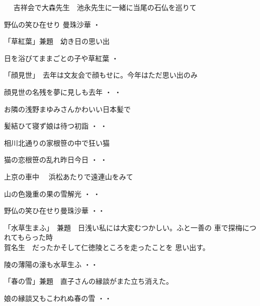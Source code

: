 　
吉祥会で大森先生　池永先生に一緒に当尾の石仏を巡りて　

\begin{shiika}
野仏の笑ひ在せり 曼珠沙華\hfill {  ・  }
\end{shiika}
\vspace{0.6cm}
「草紅葉」兼題　幼き日の思い出　
\begin{shiika}
 日を浴びてままごとの子や草紅葉\hfill {  ・  }
\end{shiika}
\vspace{0.6cm}
「顔見世」　去年は文友会で顔もせに。今年はただ思い出のみ
\begin{shiika}
顔見世の名残を夢に見しも去年\hfill {  ・  ・}
\end{shiika}
\vspace{0.6cm}
お隣の浅野まゆみさんかわいい日本髪で
\begin{shiika}
髪結ひて寝ず娘は待つ初詣\hfill {  ・  ・}
\end{shiika}
\vspace{0.6cm}
相川北通りの家根笹の中で狂い猫
\begin{shiika}
猫の恋根笹の乱れ昨日今日\hfill {  ・  ・}
\end{shiika}
\vspace{0.6cm}
上京の車中　
浜松あたりで遠連山をみて
\begin{shiika}
山の色幾重の果の雪解光\hfill {  ・  ・ }	
\end{shiika}
\vspace{0.6cm}
\begin{shiika}野仏の笑ひ在せり曼珠沙華
\hfill{・・}\end{shiika}
\vspace{0.6cm}
「水草生まふ」　兼題　日浅い私には大変むつかしい。ふと一善の
車で探梅につれてもらった時\\賀名生　だったかそして仁徳陵ところを走ったことを
思い出す。
\begin{shiika}陵の薄陽の濠も水草生ふ
\hfill{・・}\end{shiika}



\vspace{0.6cm}
「春の雪」兼題　直子さんの縁談がまた立ち消えた。
\begin{shiika}娘の縁談又もこわれぬ春の雪
\hfill{・・}\end{shiika}

